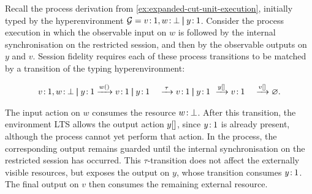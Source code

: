 \begin{example}
Recall the process derivation from \cref{ex:expanded-cut-unit-execution}, initially typed by the hyperenvironment $\mathcal{G} = v\colon\mspace{-2mu}1, w\colon\mspace{-2mu}\bot \mathbin{\boldsymbol{|}} y\colon\mspace{-2mu}1$. Consider the process execution in which the observable input on $w$ is followed by the internal synchronisation on the restricted session, and then by the observable outputs on $y$ and $v$. Session fidelity requires each of these process transitions to be matched by a transition of the typing hyperenvironment:
\begin{highlight}
\[
\begin{aligned}
\cht{v}{1}, \cht{w}{\bot} \pp \cht{y}{1}
&\lto{\lwait{w}} \cht{v}{1} \pp \cht{y}{1} \
&\lto{\tau} \cht{v}{1} \pp \cht{y}{1} \
&\lto{\lclose{y}} \cht{v}{1} \
&\lto{\lclose{v}} \emptyhyp.
\end{aligned}
\]
\end{highlight}

The input action on $w$ consumes the resource {$w\colon\mspace{-2mu}\bot$}. After this transition, the environment LTS allows the output action ${{y[]}}$, since {$y\colon\mspace{-2mu}1$} is already present, although the process cannot yet perform that action. In the process, the corresponding output remains guarded until the internal synchronisation on the restricted session has occurred. This $\tau$-transition does not affect the externally visible resources, but exposes the output on $y$, whose transition consumes {$y\colon\mspace{-2mu}1$}. The final output on $v$ then consumes the remaining external resource.
\end{example}

